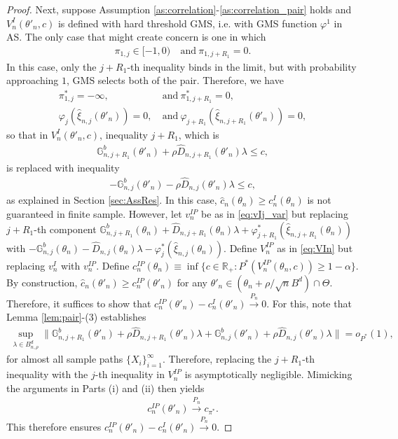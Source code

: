 \documentclass[letterpaper,11pt]{article}
\theoremstyle{myplain}
\theoremstyle{mydefinition}
\theoremstyle{myremark}
\newcommand{\R}{\mathbb{R}}
\newcommand{\thetnprime}{(\theta_n +\rho /\sqrt{n} B^d)\cap \Theta}
\numberwithin{equation}{section}
\numberwithin{figure}{section}
\begin{document}
\begin{appendices}
\begin{proof}
Next, suppose  Assumption \ref{as:correlation}-\ref{as:correlation_pair} holds and $V_n^I(\theta'_n,c)$ is defined with hard threshold GMS, i.e. with GMS function $\varphi^1$ in AS. The only case that might create concern is one in which
\begin{align}
\pi_{1,j}\in [-1,0)	~&\mathrm{and}~ \pi_{1,j+R_1}=0.
\end{align} 
In this case, only the $j+R_1$-th inequality binds in the limit, but with probability approaching $1$, GMS selects both of the pair. Therefore, we have
\begin{align}
\pi^*_{1,j}=-\infty, ~&\mathrm{and}~
\pi^*_{1,j+R_1}=0,\\
\varphi_j(\hat{\xi}_{n,j}(\theta'_n))=0, ~&\mathrm{and}~
\varphi_{j+R_1}(\hat{\xi}_{n,j+R_1}(\theta'_n))=0,
\end{align}
so that in $V_n^I(\theta'_n,c)$, inequality $j+R_1$, which is
\begin{align}
\mathbb G^b_{n,j+R_1}(\theta'_n)+\rho \hat D_{n,j+R_1}(\theta'_n)\lambda \le c,
\end{align}
is replaced with inequality
\begin{align}
-\mathbb G^b_{n,j}(\theta'_n)-\rho \hat D_{n,j}(\theta'_n)\lambda \le c,
\end{align}
as explained in Section \ref{sec:AssRes}. In this case, $\hat c_n(\theta_n)\ge c^{I}_n(\theta_n)$ is not guaranteed in finite sample. However, let $v^{IP}_n$ be as in \eqref{eq:vIj_var} but replacing  $j+R_1$-th component $\mathbb G^b_{n,j+R_1}(\theta_n)+\hat{D}_{n,j+R_1}(\theta_n)\lambda+\varphi^*_{j+R_1}(\hat{\xi}_{n,j+R_1}(\theta_n))$ with $-\mathbb G^b_{n,j}(\theta_n)-\hat{D}_{n,j}(\theta_n)\lambda-\varphi^*_j(\hat{\xi}_{n,j}(\theta_n)).$ Define $V^{IP}_n$ as in \eqref{eq:VIn} but replacing $v^I_n$ with $v^{IP}_n$. Define $c^{IP}_n(\theta_n)\equiv \inf\{c\in\R_+:P^*(V^{IP}_n(\theta_n,c))\ge 1-\alpha\}$. By construction, $\hat c_n(\theta'_n)\ge c^{IP}_n(\theta'_n)$ for any $\theta'_n\in \thetnprime$. Therefore, it suffices to show that $c_n^{IP}(\theta'_n)-c_n^I(\theta'_n)\stackrel{P_n}{\to}0$.
For this, note that Lemma \ref{lem:pair}-(3) establishes 
\begin{align}
\sup_{\lambda\in B^d_{n,\rho}}\| \mathbb G^b_{n,j+R_1}(\theta'_n)+\rho \hat D_{n,j+R_1}(\theta'_n)\lambda+\mathbb G^b_{n,j}(\theta'_n)+\rho \hat D_{n,j}(\theta'_n)\lambda \| =o_{P^*}(1),\label{eq:dif_to_zeroCT}
\end{align}
for almost all sample paths $\{X_i\}_{i=1}^\infty.$  Therefore, replacing the $j+R_1$-th inequality with the $j$-th inequality in $V^{IP}_n$ is asymptotically negligible. Mimicking the arguments in Parts (i) and (ii) then yields
\begin{align}
	c^{IP}_n(\theta'_n)\stackrel{P_n}{\to}c_{\pi^*}.
\end{align}
This therefore ensures $c_n^{IP}(\theta'_n)-c_n^I(\theta'_n)\stackrel{P_n}{\to}0$.



\end{proof}
\end{appendices}
\end{document}
